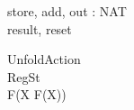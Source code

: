 \documentclass{llncs}
\begin{document}
\begin{circus}
\circchannel store, add, out : NAT\\
\circchannel result, reset\\
\end{circus}
\begin{circus}
\circprocess UnfoldAction \circdef\\
	\circbegin \circstate RegSt \\
\circspot F(\circmu X \circspot F(X))\\
	\circend\\
\end{circus}
\end{document}
